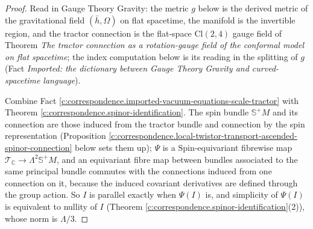 \documentclass[11pt]{article}
\theoremstyle{definition}
\theoremstyle{plain}
\providecommand{\C}{}\renewcommand{\C}{\mathbb{C}}
\providecommand{\CS}{}\renewcommand{\CS}{{\mathbb{S}^{+}}}
\providecommand{\Cl}{}\renewcommand{\Cl}{\mathrm{Cl}}
\providecommand{\hb}{}\renewcommand{\hb}{\bar{h}}
\begin{document}
\begin{proof}
Read in Gauge Theory Gravity: the metric $g$ below is the derived metric of the gravitational field $(\hb, \Omega)$ on flat spacetime, the manifold is the invertible region, and the tractor connection is the flat-space $\Cl(2,4)$ gauge field of Theorem \emph{The tractor connection as a rotation-gauge field of the conformal model on flat spacetime}; the index computation below is its reading in the splitting of $g$ (Fact \emph{Imported: the dictionary between Gauge Theory Gravity and curved-spacetime language}).

Combine Fact \ref{c:correspondence.imported-vacuum-equations-scale-tractor} with Theorem \ref{c:correspondence.spinor-identification}. The spin bundle $\CS M$ and its connection are those induced from the tractor bundle and connection by the spin representation (Proposition \ref{c:correspondence.local-twistor-transport-ascended-spinor-connection} below sets them up); $\Psi$ is a $\mathrm{Spin}$-equivariant fibrewise map $\mathcal{T}_\C \to \Lambda^2\CS M$, and an equivariant fibre map between bundles associated to the same principal bundle commutes with the connections induced from one connection on it, because the induced covariant derivatives are defined through the group action. So $I$ is parallel exactly when $\Psi(I)$ is, and simplicity of $\Psi(I)$ is equivalent to nullity of $I$ (Theorem \ref{c:correspondence.spinor-identification}(2)), whose norm is $\Lambda/3$.

\end{proof}
\end{document}
